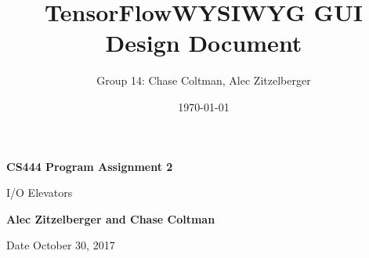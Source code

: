 \documentclass[journal,10pt,onecolumn,compsoc]{IEEEtran} \usepackage[margin=1.0in]{geometry} \usepackage{pdfpages}
\title{TensorFlow\texttrademark WYSIWYG GUI Design Document}
\author{Group 14: Chase Coltman, Alec Zitzelberger}
\date{\today}
\begin{document}
\begin{titlepage}
    \begin{center}
        \vspace*{1cm}
        
        \textbf{CS444 Program Assignment 2}
        
        \vspace{0.5cm}
        I/O Elevators
        
        \vspace{1.5cm}
        
        \textbf{Alec Zitzelberger and Chase Coltman}
        
        \vfill
        
       
        
        \vspace{0.8cm}
        
        
        
        Date October 30, 2017
        
    \end{center}
\end{titlepage}
\end{document}
